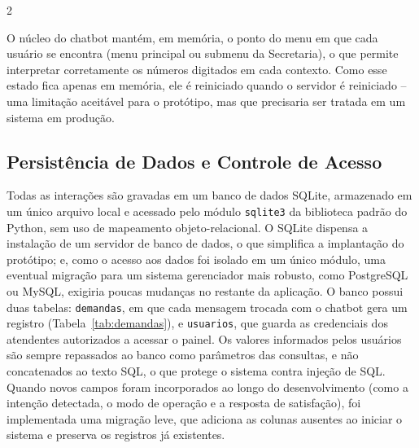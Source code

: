 \documentclass[10pt]{article}
\begin{document}
\begin{multicols}{2}

O núcleo do chatbot mantém, em memória, o ponto do menu em que cada usuário se
encontra (menu principal ou submenu da Secretaria), o que permite interpretar
corretamente os números digitados em cada contexto. Como esse estado fica
apenas em memória, ele é reiniciado quando o servidor é reiniciado -- uma
limitação aceitável para o protótipo, mas que precisaria ser tratada em um
sistema em produção.

\subsection{Persistência de Dados e Controle de Acesso}\label{sec:dados}

Todas as interações são gravadas em um banco de dados SQLite, armazenado em um
único arquivo local e acessado pelo módulo \texttt{sqlite3} da biblioteca
padrão do Python, sem uso de mapeamento objeto-relacional. O SQLite dispensa a
instalação de um servidor de banco de dados, o que simplifica a implantação do
protótipo; e, como o acesso aos dados foi isolado em um único módulo, uma
eventual migração para um sistema gerenciador mais robusto, como PostgreSQL ou
MySQL, exigiria poucas mudanças no restante da aplicação. O banco possui duas
tabelas: \texttt{demandas}, em que cada mensagem trocada com o chatbot gera um
registro (Tabela~\ref{tab:demandas}), e \texttt{usuarios}, que guarda as
credenciais dos atendentes autorizados a acessar o painel. Os valores
informados pelos usuários são sempre repassados ao banco como parâmetros das
consultas, e não concatenados ao texto SQL, o que protege o sistema contra
injeção de SQL. Quando novos campos foram incorporados ao longo do
desenvolvimento (como a intenção detectada, o modo de operação e a resposta de
satisfação), foi implementada uma migração leve, que adiciona as colunas
ausentes ao iniciar o sistema e preserva os registros já existentes.

\end{multicols}
\end{document}
